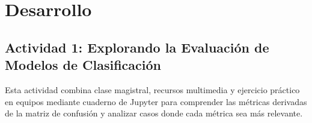 \documentclass[a4,11pt]{aleph-notas}
\begin{document}
\section*{Desarrollo}

\subsection*{Actividad 1: Explorando la Evaluación de Modelos de Clasificación}

Esta actividad combina clase magistral, recursos multimedia y ejercicio práctico en equipos mediante cuaderno de Jupyter para comprender las métricas derivadas de la matriz de confusión y analizar casos donde cada métrica sea más relevante.
\end{document}
